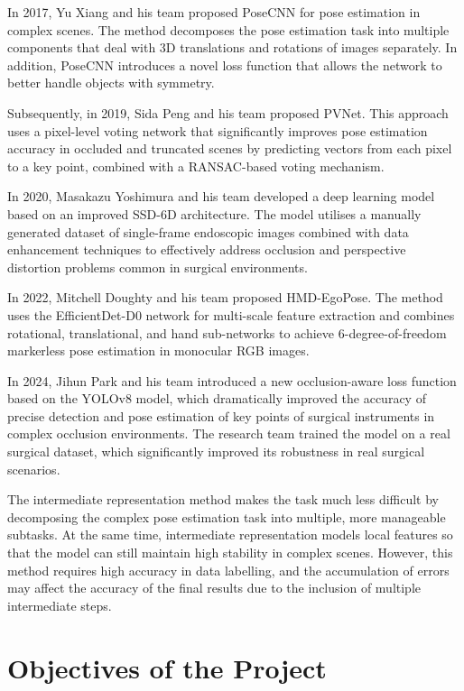 \documentclass[12pt]{article}
\begin{document}
In 2017, Yu Xiang and his team proposed PoseCNN for pose estimation in complex scenes. The method decomposes the pose estimation task into multiple components that deal with 3D translations and rotations of images separately. In addition, PoseCNN introduces a novel loss function that allows the network to better handle objects with symmetry\cite{xiang2017posecnn}.

Subsequently, in 2019, Sida Peng and his team proposed PVNet\cite{peng2019pvnet}. This approach uses a pixel-level voting network that significantly improves pose estimation accuracy in occluded and truncated scenes by predicting vectors from each pixel to a key point, combined with a RANSAC-based voting mechanism.

In 2020, Masakazu Yoshimura and his team developed a deep learning model based on an improved SSD-6D architecture\cite{yoshimura2020single}. The model utilises a manually generated dataset of single-frame endoscopic images combined with data enhancement techniques to effectively address occlusion and perspective distortion problems common in surgical environments.

In 2022, Mitchell Doughty and his team proposed HMD-EgoPose\cite{yoshimura2020single}. The method uses the EfficientDet-D0 network for multi-scale feature extraction and combines rotational, translational, and hand sub-networks to achieve 6-degree-of-freedom markerless pose estimation in monocular RGB images.

In 2024, Jihun Park and his team introduced a new occlusion-aware loss function based on the YOLOv8 model, which dramatically improved the accuracy of precise detection and pose estimation of key points of surgical instruments in complex occlusion environments\cite{park2024towards}. The research team trained the model on a real surgical dataset, which significantly improved its robustness in real surgical scenarios.

The intermediate representation method makes the task much less difficult by decomposing the complex pose estimation task into multiple, more manageable subtasks. At the same time, intermediate representation models local features so that the model can still maintain high stability in complex scenes. However, this method requires high accuracy in data labelling, and the accumulation of errors may affect the accuracy of the final results due to the inclusion of multiple intermediate steps\cite{xu2023graph}\cite{allan20183}.


\section{Objectives of the Project}
\end{document}
